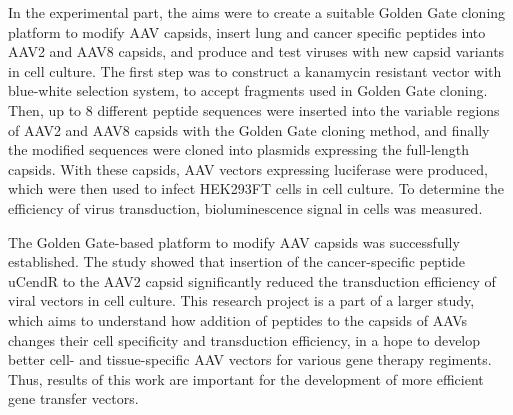 \documentclass{trkut}%
\begin{document}
In the experimental part, the aims were to create a suitable Golden Gate cloning platform to modify AAV capsids, insert lung and cancer specific peptides into AAV2 and AAV8 capsids, and produce and test viruses with new capsid variants in cell culture. The first step was to construct a kanamycin resistant vector with blue-white selection system, to accept fragments used in Golden Gate cloning. Then, up to 8 different peptide sequences were inserted into the variable regions of AAV2 and AAV8 capsids with the Golden Gate cloning method, and finally the modified sequences were cloned into plasmids expressing the full-length capsids. With these capsids, AAV vectors expressing luciferase were produced, which were then used to infect HEK293FT cells in cell culture. To determine the efficiency of virus transduction, bioluminescence signal in cells was measured.


The Golden Gate-based platform to modify AAV capsids was successfully established. The study showed that insertion of the cancer-specific peptide uCendR to the AAV2 capsid significantly reduced the transduction efficiency of viral vectors in cell culture. This research project is a part of a larger study, which aims to understand how addition of peptides to the capsids of AAVs changes their cell specificity and transduction efficiency, in a hope to develop better cell- and tissue-specific AAV vectors for various gene therapy regiments. Thus, results of this work are important for the development of more efficient gene transfer vectors.
\end{document}
